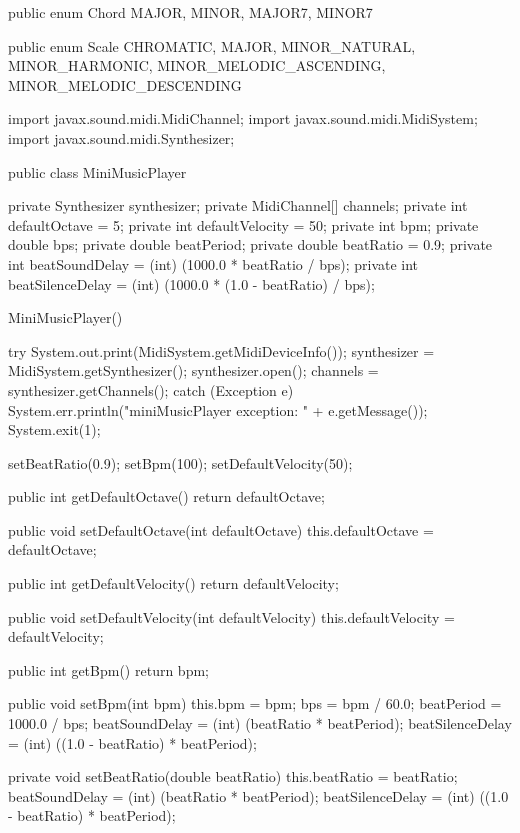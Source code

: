 \begin{codeblock}
public enum Chord {
  MAJOR, MINOR, MAJOR7, MINOR7
}
\end{codeblock}

\begin{codeblock}
public enum Scale {
  CHROMATIC, MAJOR, MINOR_NATURAL, MINOR_HARMONIC, 
  MINOR_MELODIC_ASCENDING, MINOR_MELODIC_DESCENDING
}
\end{codeblock}

\begin{codeblock}
import javax.sound.midi.MidiChannel;
import javax.sound.midi.MidiSystem;
import javax.sound.midi.Synthesizer;

public class MiniMusicPlayer {
  private Synthesizer synthesizer;
  private MidiChannel[] channels;
  private int defaultOctave = 5;
  private int defaultVelocity = 50;
  private int bpm;
  private double bps;
  private double beatPeriod;
  private double beatRatio = 0.9;
  private int beatSoundDelay = (int) (1000.0 * beatRatio / bps);
  private int beatSilenceDelay = (int) (1000.0 * (1.0 - beatRatio) / bps);

  MiniMusicPlayer() {
    try {
      System.out.print(MidiSystem.getMidiDeviceInfo());
      synthesizer = MidiSystem.getSynthesizer();
      synthesizer.open();
      channels = synthesizer.getChannels();
    } catch (Exception e) {
      System.err.println("miniMusicPlayer exception: " + e.getMessage());
      System.exit(1);
    }

    setBeatRatio(0.9);
    setBpm(100);
    setDefaultVelocity(50);
  }

  public int getDefaultOctave() {
    return defaultOctave;
  }

  public void setDefaultOctave(int defaultOctave) {
    this.defaultOctave = defaultOctave;
  }

  public int getDefaultVelocity() {
    return defaultVelocity;
  }

  public void setDefaultVelocity(int defaultVelocity) {
    this.defaultVelocity = defaultVelocity;
  }

  public int getBpm() {
    return bpm;
  }

  public void setBpm(int bpm) {
    this.bpm = bpm;
    bps = bpm / 60.0;
    beatPeriod = 1000.0 / bps;
    beatSoundDelay = (int) (beatRatio * beatPeriod);
    beatSilenceDelay = (int) ((1.0 - beatRatio) * beatPeriod);
  }

  private void setBeatRatio(double beatRatio) {
    this.beatRatio = beatRatio;
    beatSoundDelay = (int) (beatRatio * beatPeriod);
    beatSilenceDelay = (int) ((1.0 - beatRatio) * beatPeriod);
  }

}
\end{codeblock}
